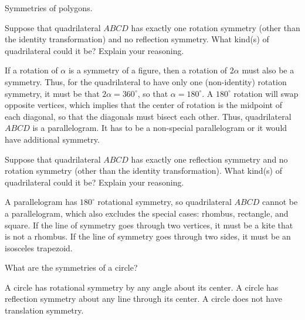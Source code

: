 \documentclass[nooutcomes]{ximera}
\begin{document}
Symmetries of polygons.  

\begin{question}
Suppose that quadrilateral $ABCD$ has exactly one rotation symmetry (other than the identity transformation) and no reflection symmetry.  What kind(s) of quadrilateral could it be?  Explain your reasoning.  
\begin{freeResponse}
\begin{hint}
If a rotation of $\alpha$ is a symmetry of a figure, then a rotation of $2\alpha$ must also be a symmetry.  Thus, for the quadrilateral to have only one (non-identity) rotation symmetry, it must be that $2\alpha = 360^\circ$, so that $\alpha = 180^\circ$.  A $180^\circ$ rotation will swap opposite vertices, which implies that the center of rotation is the midpoint of each diagonal, so that the diagonals must bisect each other.  Thus, quadrilateral $ABCD$ is a parallelogram.  It has to be a non-special parallelogram or it would have additional symmetry.  
\end{hint}
\end{freeResponse}
\end{question}

\begin{question}
Suppose that quadrilateral $ABCD$ has exactly one reflection symmetry and no rotation symmetry (other than the identity transformation).  What kind(s) of quadrilateral could it be?  Explain your reasoning.  
\begin{freeResponse}
\begin{hint}
A parallelogram has $180^\circ$ rotational symmetry, so quadrilateral $ABCD$ cannot be a parallelogram, which also excludes the special cases: rhombus, rectangle, and square.  If the line of symmetry goes through two vertices, it must be a kite that is not a rhombus.  If the line of symmetry goes through two sides, it must be an isosceles trapezoid.  
\end{hint}
\end{freeResponse}
\end{question}

\begin{question}
What are the symmetries of a circle? 
\begin{freeResponse}
\begin{hint}
A circle has rotational symmetry by any angle about its center.  A circle has reflection symmetry about any line through its center.  A circle does not have translation symmetry.  
\end{hint}
\end{freeResponse}
\end{question}
\end{document}
